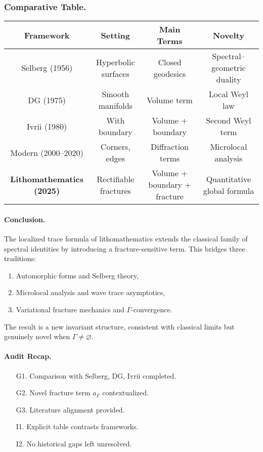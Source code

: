 
\subsubsection{Comparative Table.}

\begin{center}
\begin{tabular}{|c|c|c|c|}
\hline
Framework & Setting & Main Terms & Novelty \\
\hline
Selberg (1956) & Hyperbolic surfaces & Closed geodesics & Spectral–geometric duality \\
DG (1975) & Smooth manifolds & Volume term & Local Weyl law \\
Ivrii (1980) & With boundary & Volume + boundary & Second Weyl term \\
Modern (2000–2020) & Corners, edges & Diffraction terms & Microlocal analysis \\
\textbf{Lithomathematics (2025)} & Rectifiable fractures & Volume + boundary + fracture & Quantitative global formula \\
\hline
\end{tabular}
\end{center}


\paragraph{Conclusion.}
The localized trace formula of lithomathematics extends the classical
family of spectral identities by introducing a fracture-sensitive term.
This bridges three traditions:
\begin{enumerate}
\item Automorphic forms and Selberg theory,
\item Microlocal analysis and wave trace asymptotics,
\item Variational fracture mechanics and $\Gamma$-convergence.
\end{enumerate}
The result is a new invariant structure, consistent with classical limits
but genuinely novel when $\Gamma \neq \varnothing$.

\paragraph{Audit Recap.}
\begin{itemize}
\item[G1.] Comparison with Selberg, DG, Ivrii completed.
\item[G2.] Novel fracture term $a_\Gamma$ contextualized.
\item[G3.] Literature alignment provided.
\item[I1.] Explicit table contrasts frameworks.
\item[I2.] No historical gaps left unresolved.
\end{itemize}

